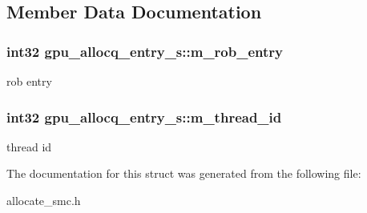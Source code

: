\subsection{Member Data Documentation}
\hypertarget{structgpu__allocq__entry__s_a09e33439833674031bf509a1ffe42fff}{
\subsubsection[{m\_\-rob\_\-entry}]{\setlength{\rightskip}{0pt plus 5cm}int32 {\bf gpu\_\-allocq\_\-entry\_\-s::m\_\-rob\_\-entry}}}
\label{structgpu__allocq__entry__s_a09e33439833674031bf509a1ffe42fff}
rob entry \hypertarget{structgpu__allocq__entry__s_a70a3a6951c998245605344425cfe4b67}{
\subsubsection[{m\_\-thread\_\-id}]{\setlength{\rightskip}{0pt plus 5cm}int32 {\bf gpu\_\-allocq\_\-entry\_\-s::m\_\-thread\_\-id}}}
\label{structgpu__allocq__entry__s_a70a3a6951c998245605344425cfe4b67}
thread id 

The documentation for this struct was generated from the following file:\begin{DoxyCompactItemize}
\item 
allocate\_\-smc.h\end{DoxyCompactItemize}
